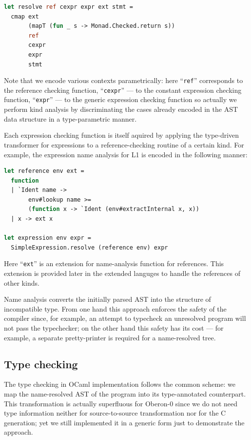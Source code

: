 \begin{lstlisting}[language=ocaml]
let resolve ref cexpr expr ext stmt =
  cmap ext 
       (mapT (fun _ s -> Monad.Checked.return s)) 
       ref 
       cexpr 
       expr 
       stmt
\end{lstlisting}

Note that we encode various contexts parametrically: here ``\lstinline{ref}'' corresponds
to the reference checking function, ``\lstinline{cexpr}'' --- to the constant expression 
checking function, ``\lstinline{expr}'' --- to the generic expression checking function
so actually we perform kind analysis by discriminating the cases already encoded in
the AST data structure in a type-parametric manner. 

Each expression checking function is itself aquired by applying the type-driven transformer 
for expressions to a reference-checking routine of a certain kind. For example, the expression 
name analysis for L1 is encoded in the following manner:

\begin{lstlisting}[language=ocaml]
let reference env ext = 
  function
  | `Ident name -> 
       env#lookup name >= 
       (function x -> `Ident (env#extractInternal x, x))
  | x -> ext x

let expression env expr = 
  SimpleExpression.resolve (reference env) expr 
\end{lstlisting}

Here ``\lstinline{ext}'' is an extension for name-analysis function for references. This 
extension is provided later in the extended languges to handle the references of other kinds.

Name analysis converts the initially parsed AST into the structure of incompatible 
type. From one hand this approach enforces the safety of the compiler since, for example, an attempt
to typecheck an unresolved program will not pass the typechecker; on the other hand this
safety has its cost --- for example, a separate pretty-printer is required for a
name-resolved tree. 

\subsection{Type checking}

The type checking in OCaml implementation follows the common scheme: we map the name-resolved
AST of the program into its type-annotated counterpart. This transformation is
actually superfluous for Oberon-0 since we do not need type information neither for
source-to-source transformation nor for the C generation; yet we still implemented it in
a generic form just to demonstrate the approach.

